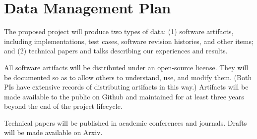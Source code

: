 \iflater
\section*{Data Management Plan}


The proposed project will produce two types of data: (1) software artifacts,
including implementations, test cases, software revision histories, and
other items; and (2) technical papers and talks describing our experiences
and results.

All software artifacts will be distributed under an open-source
license.  They will be documented so as to allow others to understand,
use, and modify them.  (Both PIs have extensive records of
distributing artifacts in this way.)  Artifacts will be made available
to the public on Github and maintained for at least three years beyond
the end of the project lifecycle.

Technical papers will be published in academic conferences and journals.
Drafts will be made available on Arxiv.

\fi